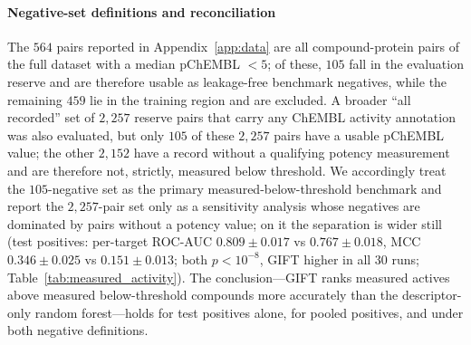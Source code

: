 \documentclass[11pt,letterpaper]{article}
\begin{document}
\paragraph{Negative-set definitions and reconciliation}
The $564$ pairs reported in Appendix~\ref{app:data} are all compound-protein pairs of the full dataset with a median pChEMBL $<5$; of these, $105$ fall in the evaluation reserve and are therefore usable as leakage-free benchmark negatives, while the remaining $459$ lie in the training region and are excluded. A broader ``all recorded'' set of $2{,}257$ reserve pairs that carry any ChEMBL activity annotation was also evaluated, but only $105$ of these $2{,}257$ pairs have a usable pChEMBL value; the other $2{,}152$ have a record without a qualifying potency measurement and are therefore not, strictly, measured below threshold. We accordingly treat the $105$-negative set as the primary measured-below-threshold benchmark and report the $2{,}257$-pair set only as a sensitivity analysis whose negatives are dominated by pairs without a potency value; on it the separation is wider still (test positives: per-target ROC-AUC $0.809\pm0.017$ vs $0.767\pm0.018$, MCC $0.346\pm0.025$ vs $0.151\pm0.013$; both $p<10^{-8}$, GIFT higher in all 30 runs; Table~\ref{tab:measured_activity}). The conclusion---GIFT ranks measured actives above measured below-threshold compounds more accurately than the descriptor-only random forest---holds for test positives alone, for pooled positives, and under both negative definitions.
\end{document}
